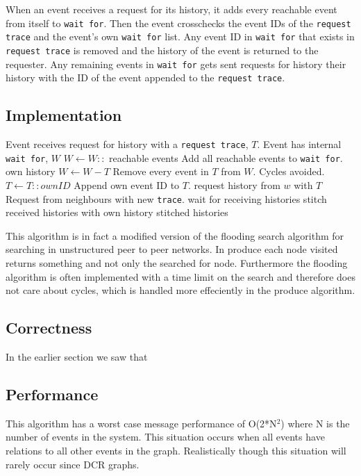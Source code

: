 	When an event receives a request for its history, it adds every reachable event from itself to \texttt{wait for}. Then the event crosschecks the event IDs of the \texttt{request trace} and the event's own \texttt{wait for} list. Any event ID in \texttt{wait for} that exists in \texttt{request trace} is removed and the history of the event is returned to the requester. Any remaining events in \texttt{wait for} gets sent requests for history their history with the ID of the event appended to the \texttt{request trace}. 
	
	\subsection*{Implementation}
	\begin{algorithmic}
		\State Event receives request for history with a \texttt{request trace}, $T$.
		\State Event has internal \texttt{wait for}, $W$
		\State
		\State $W\gets W::$ reachable events \Comment Add all reachable events to \texttt{wait for}.
		\Return own history
		\Else
		\State $W\gets W-T$ \Comment Remove every event in $T$ from $W$. Cycles avoided.
		\State $T\gets T::ownID$ \Comment Append own event ID to $T$.
		\State
		\State request history from $w$ with $T$ \Comment Request from neighbours with new \texttt{trace}.
		\EndFor
		\State wait for receiving histories
		\State stitch received histories with own history
		\State
		\Return stitched histories
		\EndIf
	\end{algorithmic}
	
	\newpar This algorithm is in fact a modified version of the flooding search algorithm for searching in unstructured peer to peer networks. In produce each node visited returns something and not only the searched for node. Furthermore the flooding algorithm is often implemented with a time limit on the search and therefore does not care about cycles, which is handled more effeciently in the produce algorithm.
	
	\subsection*{Correctness}
	In the earlier section we saw that 
	
	\subsection{Performance}
	This algorithm has a worst case message performance of O(2*N$^2$) where N is the number of events in the system. This situation occurs when all events have relations to all other events in the graph. Realistically though this situation will rarely occur since DCR graphs.
	
